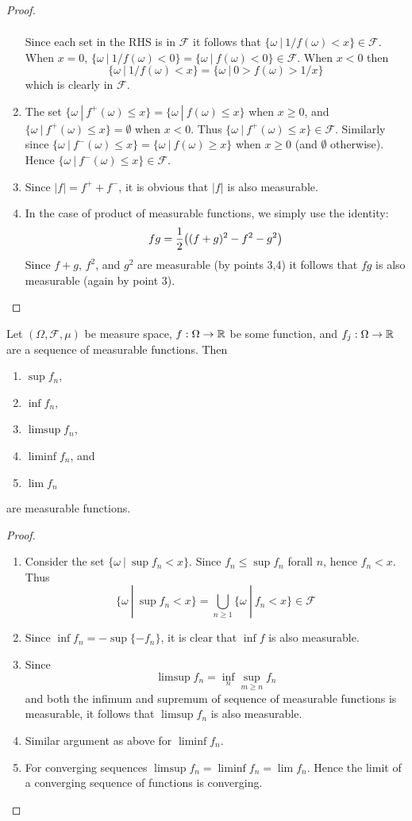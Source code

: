 \begin{proof}
\begin{enumerate}
\begin{align*}
      \end{align*}
      Since each set in the RHS is in $ \mathscr{F}$ it follows that $\{\omega\ |\ 1/f(\omega) < x\}\in \mathscr{F}$. When $x=0$, $\{\omega\ |\ 1/f(\omega) < 0\} = \{\omega\ |\ f(\omega) < 0\} \in \mathscr{F}$. When $x<0$ then
      \[\{\omega\ |\ 1/f(\omega) < x\} = \{\omega\ |\ 0>f(\omega) > 1/x\} \]
      which is clearly in $ \mathscr{F}$.\\
    \item The set $\{\omega\ |\ f^+(\omega) \leq x\} = \{\omega\ |\ f(\omega) \leq x\}$ when $x\geq 0$, and $\{\omega\ |\ f^+(\omega) \leq x\} = \emptyset$ when $x<0$. Thus $\{\omega\ |\ f^+(\omega) \leq x\}\in \mathscr{F}$. Similarly since $\{\omega\ |\ f^-(\omega) \leq x\} = \{\omega\ |\ f(\omega) \geq x\}$ when $x\geq 0$ (and $\emptyset$ otherwise). Hence $\{\omega\ |\ f^-(\omega) \leq x\}\in \mathscr{F}$.\\
    \item Since $|f| = f^+ + f^-$, it is obvious that $|f|$ is also measurable.
    \item In the case of product of measurable functions, we simply use the identity:
      \[fg = \frac{1}{2} \big((f+g)^2 - f^2 - g^2\big)\]
      Since $f+g$, $f^2$, and $g^2$ are measurable (by points 3,4) it follows that $fg$ is also measurable (again by point 3).
  \end{enumerate} 
\end{proof}
\begin{proposition}
  Let $(\Omega, \mathscr{F}, \mu)$ be measure space, $f:\Omega\to \mathbb{R}$ be some function, and $f_j:\Omega\to \mathbb{R}$ are a sequence of measurable functions. Then
  \begin{enumerate}
    \item $\sup f_n$,
    \item $\inf f_n$,
    \item $\limsup f_n$,
    \item $\liminf f_n$, and
    \item $\lim f_n$
  \end{enumerate}
  are measurable functions.
\end{proposition}
\begin{proof}
 \begin{enumerate}
   \item Consider the set $\{\omega\ |\ \sup f_n < x\}$. Since $f_n \leq \sup f_n$ forall $n$, hence $f_n < x$. Thus
     \[\{\omega\ |\ \sup f_n < x\} = \bigcup_{n\geq 1}\{\omega\ |\ f_n < x\}\in \mathscr{F} \]
   \item Since $\inf f_n = -\sup \{-f_n\}$, it is clear that $\inf f$ is also measurable.
   \item Since
     \[\limsup f_n = \inf_{n} \sup_{m\geq n} f_n\]
     and both the infimum and supremum of sequence of measurable functions is measurable, it follows that $\limsup f_n$ is also measurable.
   \item Similar argument as above for $\liminf f_n$.
   \item For converging sequences $\limsup f_n = \liminf f_n = \lim f_n$. Hence the limit of a converging sequence of functions is converging.
 \end{enumerate} 
\end{proof}
